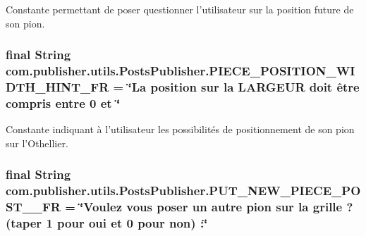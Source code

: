 Constante permettant de poser questionner l'utilisateur sur la position future de son pion. \hypertarget{interfacecom_1_1publisher_1_1utils_1_1PostsPublisher_a5696a75dded425dcb50851401eee3a4d}{
\subsubsection[{P\-I\-E\-C\-E\-\_\-\-P\-O\-S\-I\-T\-I\-O\-N\-\_\-\-W\-I\-D\-T\-H\-\_\-\-H\-I\-N\-T\-\_\-\-F\-R}]{\setlength{\rightskip}{0pt plus 5cm}final String com.\-publisher.\-utils.\-Posts\-Publisher.\-P\-I\-E\-C\-E\-\_\-\-P\-O\-S\-I\-T\-I\-O\-N\-\_\-\-W\-I\-D\-T\-H\-\_\-\-H\-I\-N\-T\-\_\-\-F\-R = \char`\"{}La position sur la L\-A\-R\-G\-E\-U\-R doit être compris entre 0 et \char`\"{}\hspace{0.3cm}{\ttfamily [static]}}}\label{interfacecom_1_1publisher_1_1utils_1_1PostsPublisher_a5696a75dded425dcb50851401eee3a4d}
Constante indiquant à l'utilisateur les possibilités de positionnement de son pion sur l'Othellier. \hypertarget{interfacecom_1_1publisher_1_1utils_1_1PostsPublisher_ab94d2dfd2e8b0196d726fce220a8ca00}{
\subsubsection[{P\-U\-T\-\_\-\-N\-E\-W\-\_\-\-P\-I\-E\-C\-E\-\_\-\-P\-O\-S\-T\-\_\-1\-\_\-\-F\-R}]{\setlength{\rightskip}{0pt plus 5cm}final String com.\-publisher.\-utils.\-Posts\-Publisher.\-P\-U\-T\-\_\-\-N\-E\-W\-\_\-\-P\-I\-E\-C\-E\-\_\-\-P\-O\-S\-T\-\_\-\_\-\-F\-R = \char`\"{}Voulez vous poser un autre pion sur la grille ? (taper 1 pour oui et 0 pour non) \-:\char`\"{}\hspace{0.3cm}{\ttfamily [static]}}}\label{interfacecom_1_1publisher_1_1utils_1_1PostsPublisher_ab94d2dfd2e8b0196d726fce220a8ca00}
